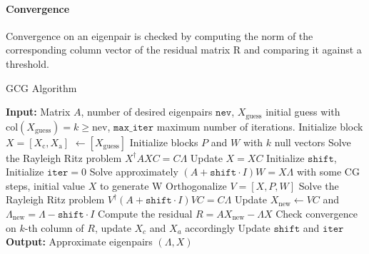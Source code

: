 \paragraph{Convergence} Convergence on an eigenpair is checked by computing the norm of the corresponding column vector of the residual matrix R and comparing it against a threshold.
\begin{algorithm}[H]
\caption{GCG Algorithm}
\begin{algorithmic}[1]
    \label{alg:mod_gcg}
\STATE \textbf{Input:} Matrix \(A\), number of desired eigenpairs \( \texttt{nev} \), $X_\text{guess}$ initial guess with $\text{col}(X_\text{guess}) = k \ge \text{nev}$, \(\texttt{max\_iter}\) maximum number of iterations.
\STATE Initialize block $X=[X_\text{c}, X_\text{a}]$ $\gets [X_\text{guess}]$
\STATE Initialize blocks \( P \) and \( W \) with \( k \) null vectors
\STATE Solve the Rayleigh Ritz problem \(X^\dagger A X C= C \Lambda \)
\STATE Update \(X=X C\)
\STATE Initialize $\texttt{shift}$, Initialize $\texttt{iter} = 0$ 
    \STATE Solve approximately \( (A+ \texttt{shift}\cdot I)W = X\Lambda \) with some CG steps, initial value $X$ to generate W
    \STATE Orthogonalize \( V=[X, P, W] \)
    \STATE Solve the Rayleigh Ritz problem \(V^\dagger (A + \texttt{shift}\cdot I) V C= C\Lambda \)
    \STATE Update \(X_\text{new} \gets V C\) and \(\Lambda_\text{new} = \Lambda - \texttt{shift}\cdot I\)
    \STATE Compute the residual \( R = AX_\text{new} - \Lambda X \) 
    \STATE Check convergence on $k$-th column of \(R\), update $X_c$ and $X_a$ accordingly
    \STATE Update $\texttt{shift}$ and $\texttt{iter}$
\ENDWHILE
\STATE \textbf{Output:} Approximate eigenpairs \( (\Lambda, X) \)
\end{algorithmic}
\end{algorithm}
